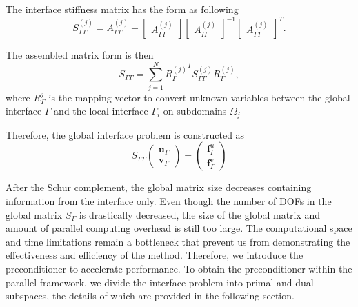 The interface stiffness matrix has the form as following
\begin{equation}
S_{\Gamma \Gamma}^{(j)} = A_{\Gamma \Gamma}^{(j)} - 
\begin{bmatrix}
A_{\Gamma I}^{(j)}
\end{bmatrix} 
\begin{bmatrix}
A_{II}^{(j)}
\end{bmatrix}^{-1}
\begin{bmatrix}
A_{\Gamma I}^{(j)}
\end{bmatrix}^{T}.
\end{equation}


The assembled matrix form is then
\begin{equation}
S_{\Gamma \Gamma} = \sum_{j = 1}^{N} {R_{\Gamma}^{(j)}}^{T} S_{\Gamma \Gamma}^{(j)}R_{\Gamma}^{(j)} ,
\end{equation}
where $ R_{\Gamma}^{j} $ is the mapping vector to convert unknown variables between the global interface $ \Gamma $ and the local interface $ \Gamma_i $ on subdomains $ \Omega_j $

Therefore, the global interface problem is constructed as 
\begin{equation}
S_{\Gamma \Gamma } \begin{pmatrix}
\mathbf{u}_{\Gamma} \\ \mathbf{v}_{\Gamma}
\end{pmatrix} = 
\begin{pmatrix}
\mathbf{f}_{\Gamma}^{u} \\ \mathbf{f}_{\Gamma}^{v}
\end{pmatrix}
\end{equation}

After the Schur complement, the global matrix size decreases containing information from the interface only. Even though the number of DOFs in the global matrix $ S_{\Gamma} $ is drastically decreased, the size of the global matrix and amount of parallel computing overhead is still too large. The computational space and time limitations remain a bottleneck that prevent us from demonstrating the effectiveness and efficiency of the method. Therefore, we introduce the preconditioner to accelerate performance. To obtain the preconditioner within the parallel framework, we divide the interface problem into primal and dual subspaces, the details of which are provided in the following section.

